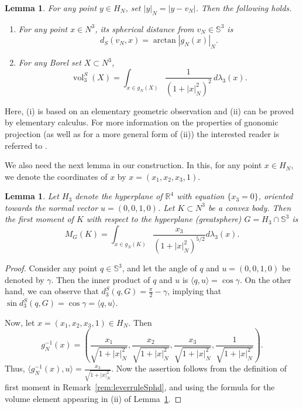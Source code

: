 \documentclass[twoside]{amsart}
\theoremstyle{plain}
\newtheorem{lemma}[theorem]{Lemma}
\theoremstyle{definition}
\numberwithin{equation}{section}
\renewcommand{\Re}{\mathbb R}
\newcommand{\Sph}{\mathbb{S}}
\DeclareMathOperator{\vol}{vol}
\begin{document}
\begin{lemma}\label{lem:sphericalvolume}
For any point $y \in H_N$, set $|y|_N = |y-v_N|$. Then the following holds.
\begin{enumerate}
\item[(i)] For any point $x \in N^3$, its spherical distance from $v_N \in \Sph^3$ is
\[
d_S(v_N,x)= \arctan |g_N(x)|_N.
\]
\item[(ii)] For any Borel set $X \subset N^3$,
\[
\vol_3^S(X) = \int_{x \in g_N(X)} \frac{1}{\left( 1+ |x|_N^2 \right)^2} \, d \lambda_3(x).
\]
\end{enumerate}
\end{lemma}

Here, (i) is based on an elementary geometric observation and (ii) can be proved by elementary calculus. For more information on the properties of gnonomic projection (as well as for a more general form of (ii)) the interested reader is referred to \cite{BW}. 

We also need the next lemma in our construction. In this, for any point $x \in H_N$, we denote the coordinates of $x$ by $x=(x_1,x_2,x_3,1)$.

\begin{lemma}\label{lem:momentcomp}
Let $H_{3}$ denote the hyperplane of $\Re^4$ with equation $\{x_3 = 0\}$, oriented towards the normal vector $u=(0,0,1,0)$. Let $K \subset N^3$ be a convex body. Then the first moment of $K$ with respect to the hyperplane (greatsphere) $G=H_{3} \cap \Sph^3$ is
\begin{equation}\label{eq:momentcomp}
M_G(K) = \int_{x \in g_N(K)} \frac{x_3}{\left( 1+ |x|_N^2 \right)^{5/2}} d \lambda_3(x).
\end{equation}
\end{lemma}

\begin{proof}
Consider any point $q \in \Sph^3$, and let the angle of $q$ and $u=(0,0,1,0)$ be denoted by $\gamma$. Then the inner product of $q$ and $u$ is $\langle q, u \rangle = \cos \gamma$. On the other hand, we can observe that $d_3^S(q,G)=\frac{\pi}{2} - \gamma$, implying that $\sin d_3^S(q,G) = \cos \gamma = \langle q, u \rangle$.

Now, let $x=(x_1,x_2,x_3,1) \in H_N$. Then
\[
g_N^{-1}(x) = \left( \frac{x_1}{\sqrt{1+|x|_N^2}}, \frac{x_2}{\sqrt{1+|x|_N^2}}, \frac{x_3}{\sqrt{1+|x|_N^2}}, \frac{1}{\sqrt{1+|x|_N^2}} \right) .
\]
Thus, $\langle g_N^{-1}(x) , u \rangle = \frac{x_3}{\sqrt{1+|x|_N^2}}$. Now the assertion follows from the definition of first moment in Remark~\ref{rem:leverruleSphd}, and using the formula for the volume element appearing in (ii) of Lemma~\ref{lem:sphericalvolume}.
\end{proof}
\end{document}
